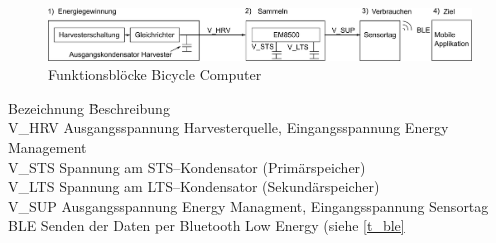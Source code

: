 




\begin{figure}[ht]
   \begin{minipage}[t]{1\textwidth}
       \includegraphics[width=1\textwidth]{3Vorgehen/imag/Blockdiagramm.png}
       \caption{Funktionsblöcke Bicycle Computer}
       \label{funktionsdiagramm_bild}
    \end{minipage}
\end{figure}

\begin{minipage}{\textwidth}
    \begin{tabbing}
        Bezeichnung \quad\= Beschreibung\\[0.8ex]
        V\_HRV \> Ausgangsspannung Harvesterquelle, Eingangsspannung Energy Management\\
        V\_STS\> Spannung am STS--Kondensator (Primärspeicher)\\
        V\_LTS\> Spannung am LTS--Kondensator (Sekundärspeicher)\\
        V\_SUP\> Ausgangsspannung Energy Managment, Eingangsspannung Sensortag\\
        BLE \> Senden der Daten per Bluetooth Low Energy (siehe \ref{t_ble} \\
    \end{tabbing} 
\end{minipage}

